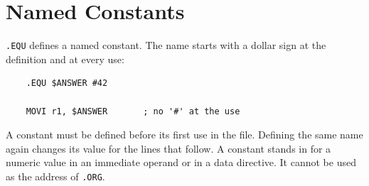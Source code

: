\section{Named Constants}
\label{sec:named-constants}

\texttt{.EQU} defines a named constant. The name starts with a dollar sign at the definition and at every use:

\begin{lstlisting}
    .EQU $ANSWER #42

    MOVI r1, $ANSWER       ; no '#' at the use
\end{lstlisting}

A constant must be defined before its first use in the file. Defining the same name again changes its value for the
lines that follow. A constant stands in for a numeric value in an immediate operand or in a data directive. It cannot
be used as the address of \texttt{.ORG}.
